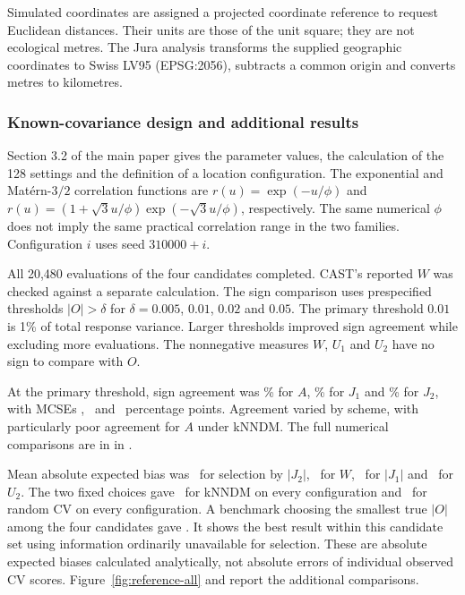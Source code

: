 \documentclass[11pt,a4paper]{article}
\begin{document}
Simulated coordinates are assigned a projected coordinate reference to request Euclidean distances. Their units are those of the unit square; they are not ecological metres. The Jura analysis transforms the supplied geographic coordinates to Swiss LV95 (EPSG:2056), subtracts a common origin and converts metres to kilometres.

\subsubsection{Known-covariance design and additional results}
\label{sec:known-details}
Section 3.2 of the main paper gives the parameter values, the calculation of the 128 settings and the definition of a location configuration. The exponential and Mat\'ern-$3/2$ correlation functions are $r(u)=\exp(-u/\phi)$ and $r(u)=(1+\sqrt{3}u/\phi)\exp(-\sqrt{3}u/\phi)$, respectively. The same numerical $\phi$ does not imply the same practical correlation range in the two families. Configuration $i$ uses seed $310000+i$.

All 20,480 evaluations of the four candidates completed. CAST's reported $W$ was checked against a separate calculation. The sign comparison uses prespecified thresholds $|O|>\delta$ for $\delta=0.005$, $0.01$, $0.02$ and $0.05$. The primary threshold $0.01$ is 1\% of total response variance. Larger thresholds improved sign agreement while excluding more evaluations. The nonnegative measures $W$, $U_1$ and $U_2$ have no sign to compare with $O$.

At the primary threshold, sign agreement was \SignA\% for $A$, \SignJOne\% for $J_1$ and \SignJTwo\% for $J_2$, with MCSEs \SignSEA, \SignSEJOne\ and \SignSEJTwo\ percentage points. Agreement varied by scheme, with particularly poor agreement for $A$ under kNNDM. The full numerical comparisons are in  in .

Mean absolute expected bias was \BiasJTwo\ for selection by $|J_2|$, \BiasW\ for $W$, \BiasJOne\ for $|J_1|$ and \BiasUTwo\ for $U_2$. The two fixed choices gave \BiasKnn\ for kNNDM on every configuration and \BiasRandom\ for random CV on every configuration. A benchmark choosing the smallest true $|O|$ among the four candidates gave \BiasOracle. It shows the best result within this candidate set using information ordinarily unavailable for selection. These are absolute expected biases calculated analytically, not absolute errors of individual observed CV scores. Figure~\ref{fig:reference-all} and  report the additional comparisons.
\end{document}
